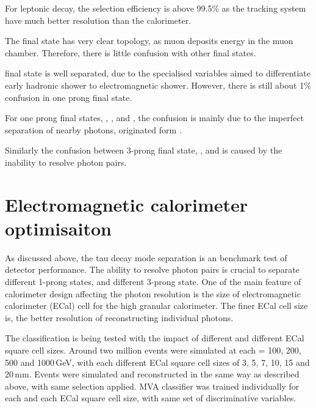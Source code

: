 For leptonic decay, the selection efficiency is above 99.5\% as the tracking system have much better resolution than the calorimeter.

The \decayMuonShort final state has very clear topology, as muon deposits energy in the muon chamber. Therefore, there is little confusion with other final states.

\decayElectronShort final state is well separated, due to the specialised variables aimed to differentiate early hadronic shower to electromagnetic shower. However, there is still about 1\% confusion in one prong final state.

For one prong final states, \decayPionShort, \decayRhoShortest, and \decayAiPhotonShortest, the confusion is mainly due to the imperfect separation of nearby photons, originated form \Ppizero.


Similarly the confusion between 3-prong final state, \decayAiPionShortest, and \decayThreePionPhotonShort is caused by the inability to resolve photon pairs.

\section{Electromagnetic calorimeter  optimisaiton}

As discussed above, the tau decay mode separation is an benchmark test of detector performance. The ability to resolve photon pairs is crucial to separate different 1-prong states, and different 3-prong state. One of the main feature of calorimeter design affecting the photon resolution is the size of electromagnetic calorimeter (ECal) cell for the high granular calorimeter. The finer ECal cell size is, the better resolution of reconstructing individual photons.


The classification is being tested with the impact of different \sqrtS and different ECal square cell sizes. Around two million events were simulated at each \sqrtS = 100, 200, 500 and 1000\,GeV, with each different ECal square cell sizes of 3, 5, 7, 10, 15 and 20\,mm. Events were simulated and reconstructed in the same way as described above, with same selection applied. MVA classifier was trained individually for each \sqrtS and each ECal square cell size, with same set of discriminative variables.

